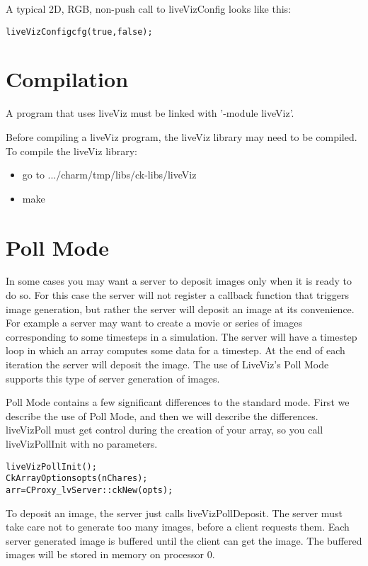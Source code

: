 A typical 2D, RGB, non-push call to liveVizConfig looks like this:
\begin{alltt}
   liveVizConfig cfg(true,false);
\end{alltt}

\section{Compilation}

A \charmpp{} program that uses liveViz must be linked with '-module liveViz'. 

Before compiling a liveViz program, the liveViz library may need to be compiled. 
To compile the liveViz library:
\begin{itemize}
\item go to .../charm/tmp/libs/ck-libs/liveViz
\item make
\end{itemize}


\section{Poll Mode}

In some cases you may want a server to deposit images only when it is ready to do so. 
For this case the server will not register a callback function that triggers image generation, but rather the server will deposit an image at its convenience.
For example a server may want to create a movie or series of images corresponding to some
timesteps in a simulation. The server will have a timestep loop in which an array computes 
some data for a timestep. At the end of each iteration the server will deposit the image. The use of LiveViz's Poll Mode supports this type of server generation of images.

Poll Mode contains a few significant differences to the standard mode. First we describe the use of Poll Mode, and then we will describe the differences. liveVizPoll must get control during the creation of your array,
so you call liveVizPollInit with no parameters.

\begin{alltt}
	liveVizPollInit();
	CkArrayOptions opts(nChares);
	arr = CProxy_lvServer::ckNew(opts);
\end{alltt}

To deposit an image, the server just calls liveVizPollDeposit. The server must take care not to generate too many images, before a client requests them. Each server generated image is buffered until the client can get the image. The buffered images will be stored in memory on processor 0.

